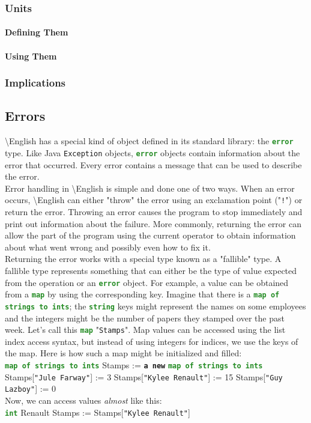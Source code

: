 \documentclass{article}
\newcommand{\English}{\textbackslash{}English}				%
\newcommand{\ssecl}[1]{\subsection{#1}\label{ssec:#1}}
\newcommand{\sssecl}[1]{\subsubsection{#1}\label{sssec:#1}}
\newcommand{\type}[1]{\texttt{\textcolor{ForestGreen}{\textbf{#1}}}}
\newcommand{\common}[1]{\texttt{\textcolor{Mulberry}{\textbf{#1}}}}
\newcommand{\codestring}[1]{\texttt{\textcolor{NavyBlue}{"#1"}}}
\newenvironment{code}[0]
{\ttfamily{}				%
\setlength\parindent{0cm}	%
~\\}
{\setlength\parindent{1cm}
~\\}
\begin{document}
\sssecl{Units}
\paragraph{Defining Them}

\paragraph{Using Them}
\sssecl{Implications}
\indent 

\ssecl{Errors}
\indent \English{} has a special kind of object defined in its standard library: the \type{error} type. Like Java \texttt{Exception} objects, \type{error} objects contain information about the error that occurred. Every error contains a message that can be used to describe the error.\\
\indent Error handling in \English{} is simple and done one of two ways. When an error occurs, \English{} can either "throw" the error using an exclamation point ("\texttt{!}") or return the error. Throwing an error causes the program to stop immediately and print out information about the failure. More commonly, returning the error can allow the part of the program using the current operator to obtain information about what went wrong and possibly even how to fix it.\\
\indent Returning the error works with a special type known as a "fallible" type. A fallible type represents something that can either be the type of value expected from the operation or an \type{error} object. For example, a value can be obtained from a \type{map} by using the corresponding key. Imagine that there is a \type{map of strings to ints}; the \type{string} keys might represent the names on some employees and the integers might be the number of papers they stamped over the past week. Let's call this \type{map} "\texttt{Stamps}". Map values can be accessed using the list index access syntax, but instead of using integers for indices, we use the keys of the map. Here is how such a map might be initialized and filled:
\begin{code}
\type{map of strings to ints} Stamps := \common{a new} \type{map of strings to ints}
Stamps[\codestring{Jule Farway}] := 3
Stamps[\codestring{Kylee Renault}] := 15
Stamps[\codestring{Guy Lazboy}] := 0
\end{code}
\indent Now, we can access values \textit{almost} like this:
\begin{code}
\type{int} Renault Stamps := Stamps[\codestring{Kylee Renault}]
\end{code}
\end{document}
